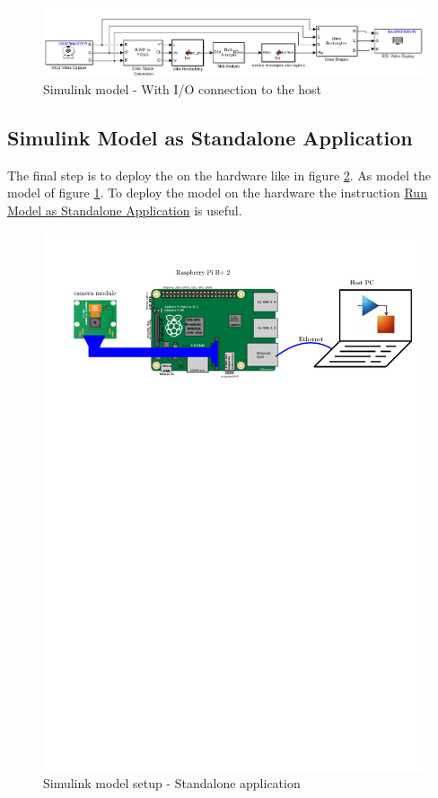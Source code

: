 \documentclass[SensorSystemsProject.tex]{subfiles}
\begin{document}
\begin{figure}[!h]
\centering
\includegraphics[width=14cm]{./img/simulink/Simulink_RaspberryPi.PNG} 
\caption{Simulink model - With I/O connection to the host}
\label{SimModelRaspIO_safsdf}
\end{figure}

\subsection{Simulink Model as Standalone Application}
The final step is to deploy the on the hardware like in figure \ref{SimModelStandalone}. As model the model of figure \ref{SimModelRaspIO_safsdf}. To deploy the model on the hardware the instruction \href{https://de.mathworks.com/help/supportpkg/rtlsdrradio/ug/run-model-as-standalone-application.html}{Run Model as Standalone Application} is useful.

\begin{figure}[!h]
\centering
\includegraphics[page=2,width=14cm]{./img/raspberryPi/setups.pdf} 
\caption{Simulink model setup - Standalone application}
\label{SimModelStandalone}
\end{figure}
\end{document}
